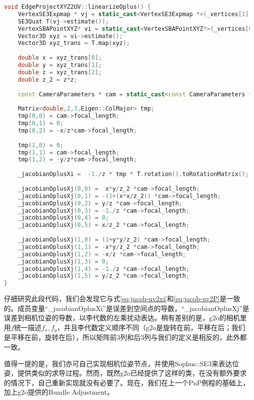 \begin{lstlisting}[language=c++]
void EdgeProjectXYZ2UV::linearizeOplus() {
	VertexSE3Expmap * vj = static_cast<VertexSE3Expmap *>(_vertices[1]);
	SE3Quat T(vj->estimate());
	VertexSBAPointXYZ* vi = static_cast<VertexSBAPointXYZ*>(_vertices[0]);
	Vector3D xyz = vi->estimate();
	Vector3D xyz_trans = T.map(xyz);
	
	double x = xyz_trans[0];
	double y = xyz_trans[1];
	double z = xyz_trans[2];
	double z_2 = z*z;
	
	const CameraParameters * cam = static_cast<const CameraParameters *>(parameter(0));
	
	Matrix<double,2,3,Eigen::ColMajor> tmp;
	tmp(0,0) = cam->focal_length;
	tmp(0,1) = 0;
	tmp(0,2) = -x/z*cam->focal_length;
	
	tmp(1,0) = 0;
	tmp(1,1) = cam->focal_length;
	tmp(1,2) = -y/z*cam->focal_length;
	
	_jacobianOplusXi =  -1./z * tmp * T.rotation().toRotationMatrix();
	
	_jacobianOplusXj(0,0) =  x*y/z_2 *cam->focal_length;
	_jacobianOplusXj(0,1) = -(1+(x*x/z_2)) *cam->focal_length;
	_jacobianOplusXj(0,2) = y/z *cam->focal_length;
	_jacobianOplusXj(0,3) = -1./z *cam->focal_length;
	_jacobianOplusXj(0,4) = 0;
	_jacobianOplusXj(0,5) = x/z_2 *cam->focal_length;
	
	_jacobianOplusXj(1,0) = (1+y*y/z_2) *cam->focal_length;
	_jacobianOplusXj(1,1) = -x*y/z_2 *cam->focal_length;
	_jacobianOplusXj(1,2) = -x/z *cam->focal_length;
	_jacobianOplusXj(1,3) = 0;
	_jacobianOplusXj(1,4) = -1./z *cam->focal_length;
	_jacobianOplusXj(1,5) = y/z_2 *cam->focal_length;
}
\end{lstlisting}

\clearpage
仔细研究此段代码，我们会发现它与式\eqref{eq:jacob-uv2xi}和\eqref{eq:jacob-uv2P}是一致的。成员变量“\_jacobianOplusXi”是误差到空间点的导数，“\_jacobianOplusXj”是误差到相机位姿的导数，以李代数的左乘扰动表达。稍有差别的是，g2o的相机里用$f$统一描述$f_x, f_y$，并且李代数定义顺序不同（g2o是旋转在前，平移在后；我们是平移在前，旋转在后），所以矩阵前3列和后3列与我们的定义是相反的，此外都一致。

值得一提的是，我们亦可自己实现相机位姿节点，并使用Sophus::SE3来表达位姿，提供类似的求导过程。然而，既然g2o已经提供了这样的类，在没有额外要求的情况下，自己重新实现就没有必要了。现在，我们在上一个PnP例程的基础上，加上g2o提供的Bundle Adjustment。

